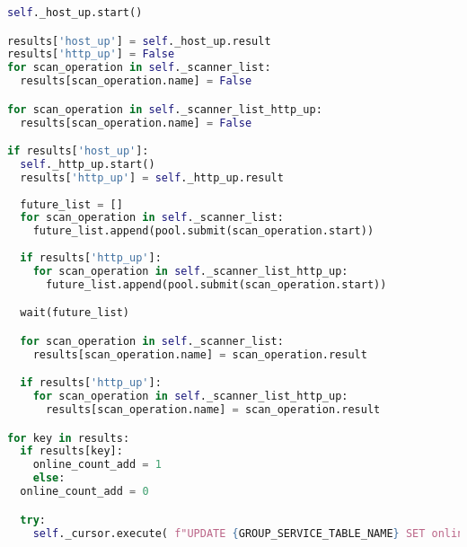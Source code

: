 \begin{lstlisting}[language=Python, frame=single, caption={Big Brother Scanner}, captionpos=b, label={lst:bigbrother-scanner}]
self._host_up.start()

results['host_up'] = self._host_up.result
results['http_up'] = False
for scan_operation in self._scanner_list:
  results[scan_operation.name] = False

for scan_operation in self._scanner_list_http_up:
  results[scan_operation.name] = False

if results['host_up']:
  self._http_up.start()
  results['http_up'] = self._http_up.result
  
  future_list = []
  for scan_operation in self._scanner_list:
    future_list.append(pool.submit(scan_operation.start))
    
  if results['http_up']:
    for scan_operation in self._scanner_list_http_up:
      future_list.append(pool.submit(scan_operation.start))

  wait(future_list)

  for scan_operation in self._scanner_list:
    results[scan_operation.name] = scan_operation.result

  if results['http_up']:
    for scan_operation in self._scanner_list_http_up:
      results[scan_operation.name] = scan_operation.result

for key in results:
  if results[key]:
    online_count_add = 1
    else:
  online_count_add = 0

  try:
    self._cursor.execute( f"UPDATE {GROUP_SERVICE_TABLE_NAME} SET online_count =  online_count + {online_count_add}, scan_count =  scan_count + 1, was_online = {results[key]}, last_scan = CURRENT_TIMESTAMP WHERE group_id = {self._id} AND service_id = {self._get_id_of_scan_operation(key)}")
\end{lstlisting}

